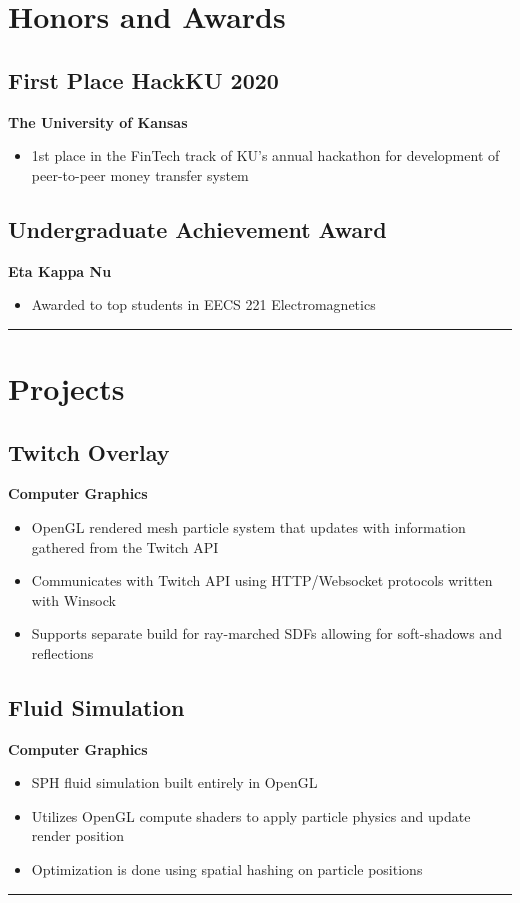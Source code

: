 \documentclass[11pt, letterpaper]{article}
\newenvironment{desItemize}
{ \begin{itemize}[leftmargin=*, topsep=1pt]
    \setlength{\itemsep}{0pt}
    \setlength{\parskip}{0pt}
    \setlength{\parsep}{0pt}
    \small     }
{ \end{itemize}                  }
\newcommand{\columnRule}{
    \noindent\hspace{-0.5\columnsep}\rule{\columnwidth + \columnsep/2}{1pt}\noindent
}
\newenvironment{rightSection}[1]
{\section*{#1}}
{\columnRule}
\begin{document}
\begin{multicols*}{2}[]
\begin{rightSection}{Honors and Awards}
    \subsection*{First Place HackKU 2020}
    \textbf{The University of Kansas}
    \begin{desItemize}
    \item 1st place in the FinTech track of KU’s annual hackathon for development of peer-to-peer money transfer system
    \end{desItemize}
    \subsection*{Undergraduate Achievement Award}
    \textbf{Eta Kappa Nu}
    \begin{desItemize}
    \item Awarded to top students in EECS 221 Electromagnetics
    \end{desItemize}
\end{rightSection}
\begin{rightSection}{Projects}
    \subsection*{Twitch Overlay}
    \textbf{Computer Graphics}
    \begin{desItemize}
    \item OpenGL rendered mesh particle system that updates with information gathered from the Twitch API
    \item Communicates with Twitch API using HTTP/Websocket protocols written with Winsock 
    \item Supports separate build for ray-marched SDFs allowing for soft-shadows and reflections
    \end{desItemize}
    \subsection*{Fluid Simulation}
    \textbf{Computer Graphics}
    \begin{desItemize}
    \item SPH fluid simulation built entirely in OpenGL
    \item Utilizes OpenGL compute shaders to apply particle physics and update render position
    \item Optimization is done using spatial hashing on particle positions
    \end{desItemize}

\end{rightSection}
\end{multicols*}
\end{document}
